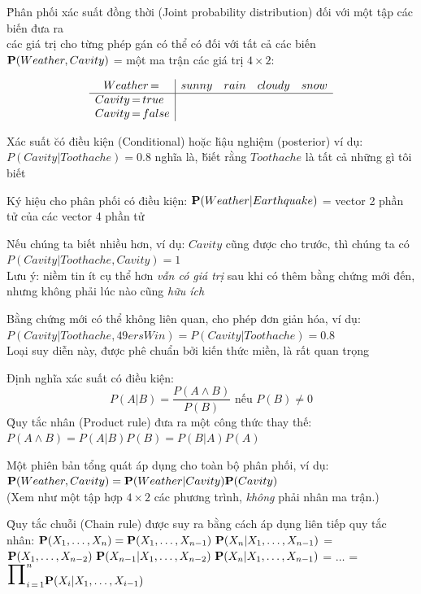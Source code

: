 \documentclass[fleqn]{article}
\begin{document}
\begin{huge}
\u{Phân phối xác suất đồng thời (Joint probability distribution)} đối với một tập các biến đưa ra\\
các giá trị cho từng phép gán có thể có đối với tất cả các biến\al
  $\mbox{{\bf P}}(Weather,Cavity)$ = một ma trận các giá trị $4 \times 2$:

\[\begin{array}{l|cccc}
\hfil Weather \eq & sunny & rain & cloudy & snow \\
\hline
Cavity \eq true & & & & \\
Cavity \eq false & & & &
\end{array}\]




Xác suất \u{có điều kiện (Conditional)} hoặc \u{hậu nghiệm (posterior)}\al
  ví dụ: $P(Cavity | Toothache) = 0.8$\al
  nghĩa là, \u{\u{biết rằng $Toothache$ là tất cả những gì tôi biết}}

Ký hiệu cho phân phối có điều kiện:\al
  $\mbox{{\bf P}}(Weather | Earthquake)$ = vector 2 phần tử của các vector 4 phần tử

Nếu chúng ta biết nhiều hơn, ví dụ: $Cavity$ cũng được cho trước, thì chúng ta có\al
  $P(Cavity | Toothache,Cavity) = 1$\\
Lưu ý: niềm tin ít cụ thể hơn {\em vẫn có giá trị} sau khi có thêm bằng chứng
mới đến, nhưng không phải lúc nào cũng {\em hữu ích}

Bằng chứng mới có thể không liên quan, cho phép đơn giản hóa, ví dụ:\al
$P(Cavity | Toothache,49ersWin) = P(Cavity | Toothache) = 0.8$\\
Loại suy diễn này, được phê chuẩn bởi kiến thức miền, là rất quan trọng


Định nghĩa xác suất có điều kiện:
\[
  P(A|B) = \frac{P(A\land B)}{P(B)} \mbox{ nếu } P(B) \neq 0
\]
\u{Quy tắc nhân (Product rule)} đưa ra một công thức thay thế:\al
  $P(A\land B) = P(A|B)P(B) = P(B|A)P(A)$

Một phiên bản tổng quát áp dụng cho toàn bộ phân phối, ví dụ:\al
  $\mbox{{\bf P}}(Weather,Cavity) = \mbox{{\bf P}}(Weather|Cavity) \mbox{{\bf P}}(Cavity)$\\
(Xem như một tập hợp $4\times 2$ các phương trình, {\em không} phải nhân ma trận.)

\u{Quy tắc chuỗi (Chain rule)} được suy ra bằng cách áp dụng liên tiếp quy tắc nhân:\al
$\pv(X_1,\ldots,X_n) = \pv(X_1,\ldots,X_{n-1})\ 
                        \pv(X_n | X_1,\ldots,X_{n-1})$\nl
                    = $\pv(X_1,\ldots,X_{n-2})\ 
                        \pv(X_{n-1} | X_1,\ldots,X_{n-2})\ 
                        \pv(X_n | X_1,\ldots,X_{n-1})$\nl
                  = $\ldots$\nl
                  = $\myprod_{i\eq 1}^n \pv(X_i | X_1,\ldots,X_{i-1})$




\end{huge}
\end{document}
